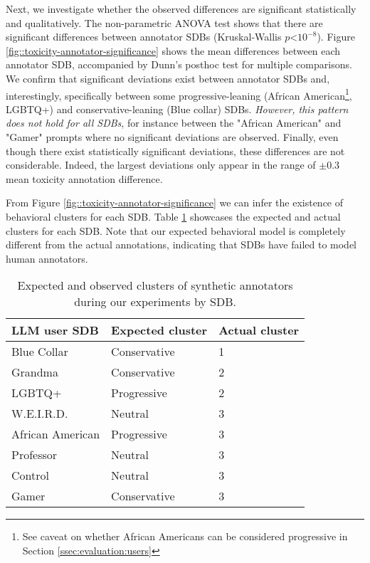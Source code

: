 Next, we investigate whether the observed differences are significant statistically and qualitatively. The non-parametric ANOVA test shows that there are significant differences between annotator \acp{SDB} (Kruskal-Wallis $p\text{<}10^{-8}$). Figure \ref{fig::toxicity-annotator-significance} shows the mean differences between each annotator \ac{SDB}, accompanied by Dunn's posthoc test for multiple comparisons. We confirm that significant deviations exist between annotator \acp{SDB} and, interestingly, specifically between some progressive-leaning (African American\footnote{See caveat on whether African Americans can be considered progressive in Section \ref{ssec:evaluation:users}}, LGBTQ+) and conservative-leaning (Blue collar) \acp{SDB}. \textit{However, this pattern does not hold for all \acp{SDB}}, for instance between the "African American" and "Gamer" prompts where no significant deviations are observed. Finally, even though there exist statistically significant deviations, these differences are not considerable. Indeed, the largest deviations only appear in the range of $\pm 0.3$ mean toxicity annotation difference.

From Figure \ref{fig::toxicity-annotator-significance} we can infer the existence of behavioral clusters for each \ac{SDB}. Table \ref{tab:annotator-sdb-behavior} showcases the expected and actual clusters for each \ac{SDB}. Note that our expected behavioral model is completely different from the actual annotations, indicating that \acp{SDB} have failed to model human annotators.


\begin{table}
	\begin{tabular}
		{ |p{3cm}|p{3cm}|p{3cm}|}
		\hline
		\cellcolor{blue!25}\textbf{LLM user SDB} & \cellcolor{blue!25}\textbf{Expected cluster} & \cellcolor{blue!25}\textbf{Actual cluster}\\
		\hline
		Blue Collar & Conservative & 1 \\
		\hline
		Grandma & Conservative & 2\\
		\hline
		LGBTQ+ & Progressive & 2\\
		\hline
		\ac{W.E.I.R.D.} & Neutral & 3\\
		\hline
		African American & Progressive & 3\\
		\hline
		Professor & Neutral & 3\\
		\hline
		Control & Neutral & 3\\
		\hline
		Gamer & Conservative & 3\\
		\hline
	\end{tabular}
	\caption{Expected and observed clusters of synthetic annotators during our experiments by \ac{SDB}.}
	\label{tab:annotator-sdb-behavior}
\end{table}


